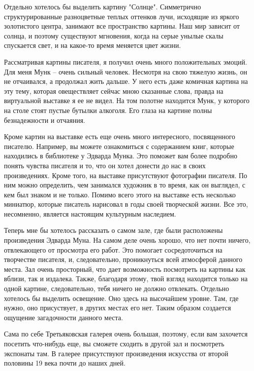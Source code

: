 \documentclass[a4paper, 12pt]{article}
\begin{document}
Отдельно хотелось бы выделить картину "Солнце". Симметрично структурированные разноцветные теплых оттенков лучи, исходящие из яркого золотистого центра, занимают все пространство картины. Наш мир зависит от солнца, и поэтому существуют мгновения, когда на серые унылые скалы спускается свет, и на какое-то время меняется цвет жизни.

Рассматривая картины писателя, я получил очень много положительных эмоций. Для меня Мунк – очень сильный человек. Несмотря на свою тяжелую жизнь, он не отчаивался, а продолжал жить дальше. У него есть даже комичная картина на эту тему, которая овеществляет сейчас мною сказанные слова, правда на виртуальной выставке я ее не видел. На том полотне находится Мунк, у которого на столе стоят пустые бутылки алкоголя. Его глаза на картине полны безнадежности и отчаяния.

Кроме картин на выставке есть еще очень много интересного, посвященного писателю. Например, вы можете ознакомиться с содержанием книг, которые находились в библиотеке у Эдварда Мунка. Это поможет вам более подробно понять чувства писателя и то, что он хотел донести до нас в своих произведениях. Кроме того, на выставке присутствуют фотографии писателя. По ним можно определить, чем занимался художник в то время, как он выглядел, с кем был знаком и не только. Помимо всего этого на выставке есть несколько миниатюр, которые писатель нарисовал в годы своей творческой жизни. Все это, несомненно, является настоящим культурным наследием.

Теперь мне бы хотелось рассказать о самом зале, где были расположены произведения Эдварда Муна. На самом деле очень хорошо, что нет почти ничего, отвлекающего от просмотра его работ. Это помогает сосредоточиться на творчестве писателя, и, следовательно, проникнуться всей атмосферой данного места. Зал очень просторный, что дает возможность посмотреть на картины как вблизи, так и издалека. Также, благодаря этому, твой взгляд находится только на одной картине, следовательно, тебя ничего не должно отвлекать. Отдельно хотелось бы выделить освещение. Оно здесь на высочайшем уровне. Там, где нужно, оно присуствует, в других местах его нет. Таким образом создается ощущение загадочности данного места.

Сама по себе Третьяковская галерея очень большая, поэтому, если вам захочется посетить что-нибудь еще, вы сможете сходить в другой зал и посмотреть экспонаты там. В галерее присутствуют произведения искусства от второй половины 19 века почти до наших дней.
\end{document}
